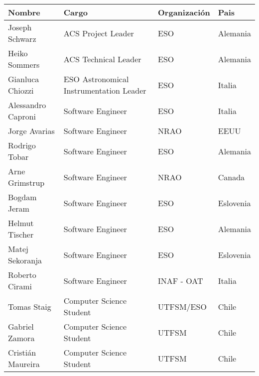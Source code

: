 \begin{tabular}{|l|l|l|l|}
	\hline
	{\bf Nombre} & {\bf Cargo} & {\bf Organización} & {\bf Pais} \\\hline
	Joseph Schwarz & ACS Project Leader & ESO & Alemania \\\hline
	Heiko Sommers & ACS Technical Leader & ESO & Alemania \\\hline
	Gianluca Chiozzi & ESO Astronomical Instrumentation Leader & ESO & Italia \\\hline
	Alessandro Caproni & Software Engineer& ESO & Italia \\\hline
	Jorge Avarias & Software Engineer & NRAO & EEUU \\\hline
	Rodrigo Tobar & Software Engineer & ESO & Alemania \\\hline
	Arne Grimstrup & Software Engineer & NRAO & Canada \\\hline
	Bogdam Jeram & Software Engineer & ESO & Eslovenia \\\hline
	Helmut Tischer & Software Engineer & ESO & Alemania \\\hline
	Matej Sekoranja & Software Engineer  & ESO & Eslovenia \\\hline
	Roberto Cirami & Software Engineer & INAF - OAT & Italia\\\hline
	Tomas Staig & Computer Science Student & UTFSM/ESO & Chile \\\hline
	Gabriel Zamora & Computer Science Student & UTFSM & Chile \\\hline
	Cristián Maureira & Computer Science Student & UTFSM & Chile \\\hline	
\end{tabular}
\newpage
